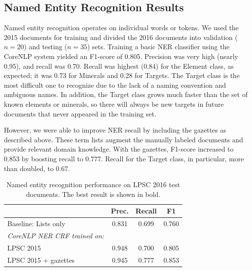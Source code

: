 \documentclass[letterpaper]{article} %
\begin{document}
\subsection{Named Entity Recognition Results}

Named entity recognition operates on individual words or tokens.  We
used the 2015 documents for training and divided the 2016 documents
into validation ($n=20$) and testing ($n=35$) sets.  
Training a basic NER classifier using the CoreNLP system yielded an
F1-score of 0.805.  Precision was very high (nearly 0.95), and recall
was 0.70.  Recall was highest (0.84) for the Element class, as
expected; it was 0.73 for Minerals and 0.28 for Targets.  The Target
class is the most difficult one to recognize due to the lack of a
naming convention and ambiguous names.  In addition, the Target class
grows much faster than the set of known elements or minerals, so there
will always be new targets in future documents that never appeared in
the training set.

However, we were able to improve NER recall by including the gazettes
as described above.  These term lists augment the manually labeled
documents and provide relevant domain knowledge.  With the gazettes,
F1-score increased to 0.853 by boosting recall to 0.777.  Recall for
the Target class, in particular, more than doubled, to 0.67.

\begin{table}
\caption{Named entity recognition performance on LPSC 2016 test documents.  
The best result is shown in bold.}
\label{tab:ner}
\begin{center}
\begin{tabular}{l|ccc}
 & Prec. & Recall & F1 \\ \hline
Baseline: Lists only & 0.831 & 0.699 & 0.760 \\ \hline  %
{\em CoreNLP NER CRF trained on:} & & \\
LPSC 2015            & 0.948 & 0.700 & 0.805 \\
LPSC 2015 + gazettes & 0.945 & 0.777 & 0.853 \\
\hline
\end{tabular}
\end{center}
\end{table}
\end{document}
